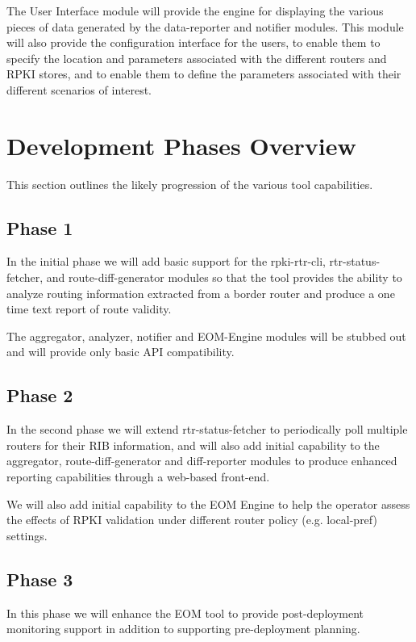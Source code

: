 The User Interface module will provide the engine for displaying the
various pieces of data generated by the data-reporter and notifier
modules. This module will also provide the configuration interface for
the users, to enable them to specify the location and parameters
associated with the different routers and RPKI stores, and to enable them
to define the parameters associated with their different scenarios of
interest.


\section{Development Phases Overview}

This section outlines the likely progression of the various tool
capabilities.

\subsection{Phase 1}

In the initial phase we will add basic support for the
rpki-rtr-cli, rtr-status-fetcher, and route-diff-generator modules so
that the tool provides the ability to analyze routing information
extracted from a border router and produce a one time text report of
route validity.

The aggregator, analyzer, notifier and EOM-Engine modules will
be stubbed out and will provide only basic API compatibility. 

\subsection{Phase 2}

In the second phase we will extend rtr-status-fetcher to periodically poll
multiple routers for their RIB information, and will also add initial
capability to the aggregator, route-diff-generator and diff-reporter modules
to produce enhanced reporting capabilities through a web-based
front-end.

We will also add initial capability to the EOM Engine to
help the operator assess the effects of RPKI validation under 
different router policy (e.g. local-pref) settings. 

\subsection{Phase 3}

In this phase we will enhance the EOM tool to provide post-deployment
monitoring support in addition to supporting pre-deployment planning. 

